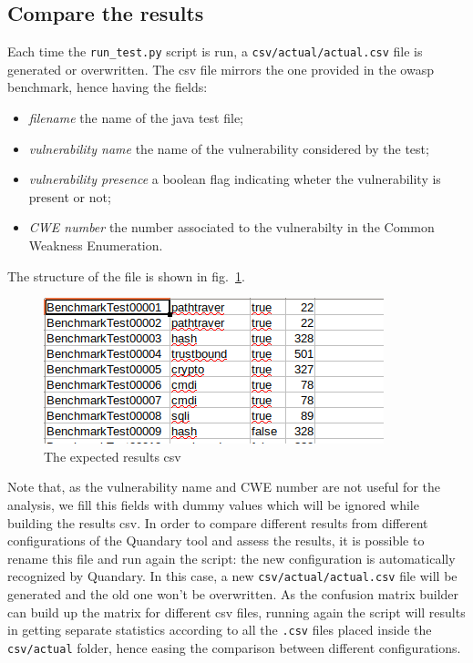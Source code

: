 \documentclass[../Report.tex]{subfiles}
\begin{document}
\subsection{Compare the results}
Each time the \texttt{run\_test.py} script is run, a \texttt{csv/actual/actual.csv} file is generated or overwritten. The csv file mirrors the one provided in the owasp benchmark, hence having the fields:
\begin{itemize}
	\item \emph{filename} the name of the java test file;
	\item \emph{vulnerability name} the name of the vulnerability considered by the test;
	\item \emph{vulnerability presence} a boolean flag indicating wheter the vulnerability is
	present or not;
	\item \emph{CWE number} the number associated to the vulnerabilty in the Common Weakness
	Enumeration.
\end{itemize}
The structure of the file is shown in fig.~\ref{img:csv}.

\begin{figure}
	\begin{center}
		\includegraphics[scale=0.5]{res.png}
	\end{center}
	\caption{The expected results csv}
	\label{img:csv}
\end{figure}

Note that, as the vulnerability name and CWE number are not useful for the analysis, we fill this fields with dummy values which will be ignored while building the results csv.
In order to compare different results from different configurations of the Quandary tool and assess the results, it is possible to rename this file and run again the script: the new configuration is automatically recognized by Quandary. In this case, a new \texttt{csv/actual/actual.csv} file will be generated and the old one won't be overwritten. As the confusion matrix builder can build up the matrix for different csv files, running again the script will results in getting separate statistics according to all the \texttt{.csv} files placed inside the \texttt{csv/actual} folder, hence easing the comparison between different configurations.
\end{document}
